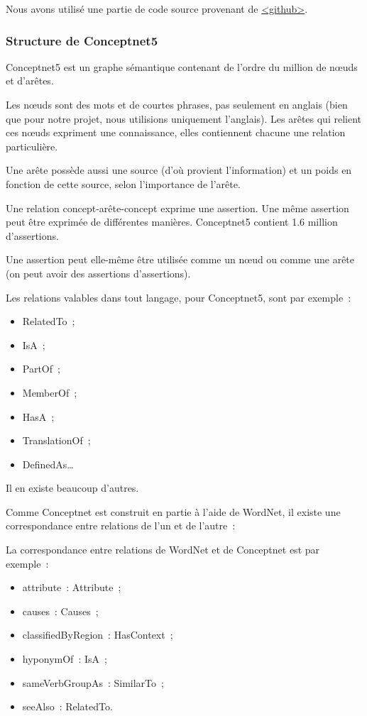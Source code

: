 \documentclass[a4paper, 12pt]{article}
\begin{document}
Nous avons utilisé une partie de code source provenant de \href{https://github.com/commonsense/conceptnet5}{<github>}.


\subsubsection{Structure de Conceptnet5}

Conceptnet5 est un graphe sémantique contenant de l'ordre du million de nœuds et d'ar\^etes.

Les n\oe{}uds sont des mots et de courtes phrases, pas seulement en anglais (bien que pour notre projet, nous utilisions uniquement l'anglais). Les arêtes qui relient ces n\oe{}uds expriment une connaissance, elles contiennent chacune une relation particulière.

Une arête possède aussi une source (d'où provient l'information) et un poids en fonction de cette source, selon l'importance de l'arête.

Une relation concept-arête-concept exprime une assertion. Une même assertion peut être exprimée de différentes manières. Conceptnet5 contient 1.6 million d'assertions.

Une assertion peut elle-même être utilisée comme un n\oe{}ud ou comme une arête (on peut avoir des assertions d'assertions).

Les relations valables dans tout langage, pour Conceptnet5, sont par exemple~:
\begin{itemize}
 \item RelatedTo~;
 \item IsA~;
 \item PartOf~;
 \item MemberOf~;
 \item HasA~;
 \item TranslationOf~;
 \item DefinedAs\ldots{}
\end{itemize}

Il en existe beaucoup d'autres.

Comme Conceptnet est construit en partie à l'aide de WordNet, il existe une correspondance entre relations de l'un et de l'autre~:

La correspondance entre relations de WordNet et de Conceptnet est par exemple~:
\begin{itemize}
 \item attribute~: Attribute~;
 \item causes~: Causes~;
 \item classifiedByRegion~: HasContext~;
 \item hyponymOf~: IsA~;
 \item sameVerbGroupAs~: SimilarTo~;
 \item seeAlso~: RelatedTo.
\end{itemize}
\end{document}
